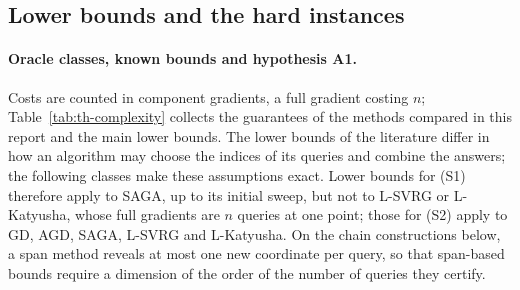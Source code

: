 \subsection{Lower bounds and the hard instances}\label{sec:th-A1}

\paragraph{Oracle classes, known bounds and hypothesis A1.}
Costs are counted in component gradients, a full gradient costing $n$; Table~\ref{tab:th-complexity} collects the
guarantees of the methods compared in this report and the main lower bounds. The lower bounds of the literature differ
in how an algorithm may choose the indices of its queries and combine the answers; the following classes make these
assumptions exact.
Lower bounds for (S1) therefore apply to SAGA, up to its initial sweep, but not to L-SVRG or L-Katyusha, whose full
gradients are $n$ queries at one point; those for (S2) apply to GD, AGD, SAGA, L-SVRG and L-Katyusha. On the chain
constructions below, a span method reveals at most one new coordinate per query, so that span-based bounds require a
dimension of the order of the number of queries they certify.

